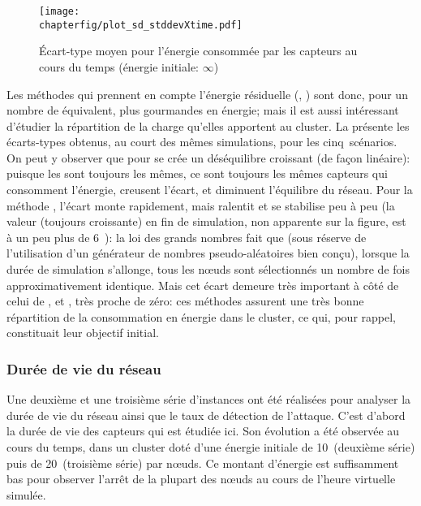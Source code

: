 \begin{figure}[p]
    \centering
    \texttt{[image: \\chapterfig/plot\_sd\_stddevXtime.pdf]}
    \caption[Écart-type moyen pour l'énergie consommée par les capteurs au cours du temps]{Écart-type moyen pour l'énergie consommée par les capteurs au cours du temps (énergie initiale: $\infty$)}\label{sd:fig:stddev-inf}
\end{figure}
\pagebreak %
Les méthodes qui prennent en compte l'énergie résiduelle (\ideres, \iddemx) sont donc, pour un nombre de \cns équivalent, plus gourmandes en énergie; mais il est aussi intéressant d'étudier la répartition de la charge qu'elles apportent au cluster.
La  présente les écarts-types obtenus, au court des mêmes simulations, pour les cinq~scénarios.
On peut y observer que pour \idstat se crée un déséquilibre croissant (de façon linéaire): puisque les \cns sont toujours les mêmes, ce sont toujours les mêmes capteurs qui consomment l'énergie, creusent l'écart, et diminuent l'équilibre du réseau.
Pour la méthode \idrand, l'écart monte rapidement, mais ralentit et se stabilise peu à peu (la valeur (toujours croissante) en fin de simulation, non apparente sur la figure, est à un peu plus de 6~\joule): la loi des grands nombres fait que (sous réserve de l'utilisation d'un générateur de nombres pseudo-aléatoires bien conçu), lorsque la durée de simulation s'allonge, tous les nœuds sont sélectionnés un nombre de fois approximativement identique.
Mais cet écart demeure très important à côté de celui de \ideres, \iddemx et \iddems, très proche de zéro: ces méthodes assurent une très bonne répartition de la consommation en énergie dans le cluster, ce qui, pour rappel, constituait leur objectif initial.

        \subsubsection{Durée de vie du réseau}
Une deuxième et une troisième série d'instances ont été réalisées pour analyser la durée de vie du réseau ainsi que le taux de détection de l'attaque.
C'est d'abord la durée de vie des capteurs qui est étudiée ici.
Son évolution a été observée au cours du temps, dans un cluster doté d'une énergie initiale de 10~\joule (deuxième série) puis de 20~\joule (troisième série) par nœuds.
Ce montant d'énergie est suffisamment bas pour observer l'arrêt de la plupart des nœuds au cours de l'heure virtuelle simulée.

